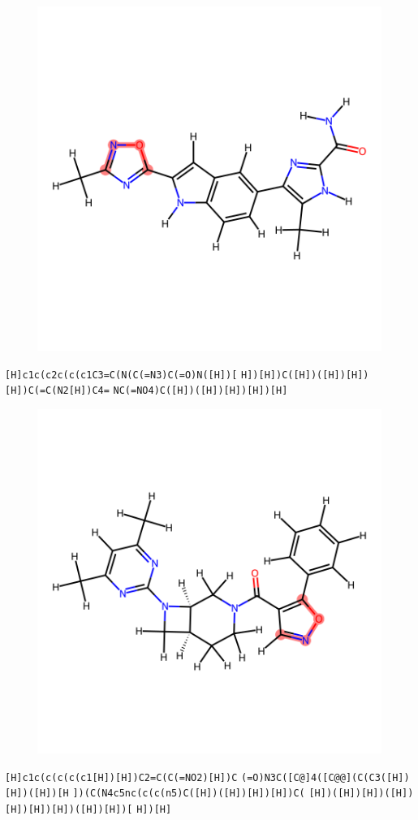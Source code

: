 \documentclass{article}
\begin{document}
\begin{figure}[ht]
\centering
    \includegraphics{mol52.png}
\end{figure}
\verb|[H]c1c(c2c(c(c1C3=C(N(C(=N3)C(=O)N([H])[| \verb|H])[H])C([H])([H])[H])[H])C(=C(N2[H])C4=| \verb|NC(=NO4)C([H])([H])[H])[H])[H]|

\begin{figure}[ht]
\centering
    \includegraphics{mol53.png}
\end{figure}
\verb|[H]c1c(c(c(c(c1[H])[H])C2=C(C(=NO2)[H])C| \verb|(=O)N3C([C@]4([C@@](C(C3([H])[H])([H])[H| \verb|])(C(N4c5nc(c(c(n5)C([H])([H])[H])[H])C(| \verb|[H])([H])[H])([H])[H])[H])[H])([H])[H])[| \verb|H])[H]|
\end{document}
